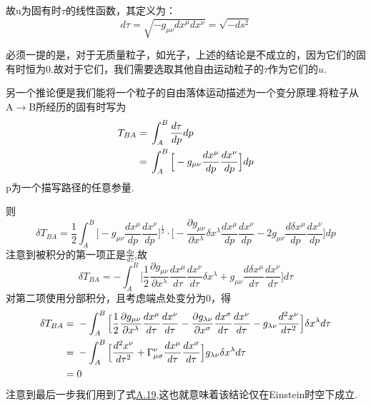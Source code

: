 \documentclass[a4paper]{book}
\begin{document}
\begin{appendix}
故u为固有时$\tau$的线性函数，其定义为：
\begin{equation}
	d\tau=\sqrt{-g_{\mu \nu}dx^{\mu}dx^{\nu}}=\sqrt{-ds^2}
\end{equation}\par 
必须一提的是，对于无质量粒子，如光子，上述的结论是不成立的，因为它们的固有时恒为0.故对于它们，我们需要选取其他自由运动粒子的$\tau$作为它们的$u$.\par 
另一个推论便是我们能将一个粒子的自由落体运动描述为一个变分原理.将粒子从A$\rightarrow$B所经历的固有时写为
\begin{align}
	T_{BA}={}&\int^{B}_{A}\frac{d\tau}{dp}dp \notag \\
	      ={}&\int^{B}_{A}\Big[-g_{\mu \nu}\frac{dx^{\mu}}{dp}\frac{dx^{\nu}}{dp}\Big]dp
\end{align}
p为一个描写路径的任意参量.\par 
则
\begin{equation}
	\delta 	T_{BA}=\frac{1}{2}\int^{B}_{A}\Big[-g_{\mu \nu}\frac{dx^{\mu}}{dp}\frac{dx^{\nu}}{dp}\Big]^{\frac{1}{2}}\cdot \Big[-\frac{\partial g_{\mu \nu}}{\partial x^{\lambda}}\delta x^{\lambda}\frac{dx^{\mu}}{dp}\frac{dx^{\nu}}{dp}-2g_{\mu \nu}\frac{d\delta x^{\mu}}{dp}\frac{dx^{\nu}}{dp}\Big]dp
\end{equation}
注意到被积分的第一项正是$\frac{dp}{d\tau}$,故
\begin{equation}
		\delta 	T_{BA}=-\int^{B}_{A}\Big[\frac{1}{2}\frac{\partial g_{\mu \nu}}{\partial x^{\lambda}}\frac{dx^{\mu}}{d\tau}\frac{dx^{\nu}}{d\tau}\delta x^{\lambda}+g_{\mu \nu}\frac{d\delta x^{\mu}}{d\tau}\frac{dx^{\nu}}{d\tau}\Big]d\tau
\end{equation}
对第二项使用分部积分，且考虑端点处变分为0，得
\begin{align}
	\delta 	T_{BA}={}&-\int^{B}_{A}\Big[\frac{1}{2}\frac{\partial g_{\mu \nu}}{\partial x^{\lambda}}\frac{dx^{\mu}}{d\tau}\frac{dx^{\nu}}{d\tau}-\frac{\partial g_{\lambda \nu}}{\partial x^{\sigma}}\frac{dx^{\sigma}}{d\tau}\frac{dx^{\nu}}{d\tau}-g_{\lambda \nu}\frac{d^{2}x^{\nu}}{d\tau^2}\Big ]\delta x^{\lambda}d\tau \notag\\
	={}&-\int^{B}_{A}\Big[\frac{d^{2}x^{\nu}}{d\tau^2}+\Gamma^{\nu}_{\mu \sigma}\frac{dx^{\mu}}{d\tau}\frac{dx^{\sigma}}{d\tau}\Big ]g_{\lambda \nu}\delta x^{\lambda}d\tau \notag \\
	={}& 0
\end{align}
注意到最后一步我们用到了式\hyperref[A.19]{A.19},这也就意味着该结论仅在Einstein时空下成立.

\end{appendix}
\end{document}
